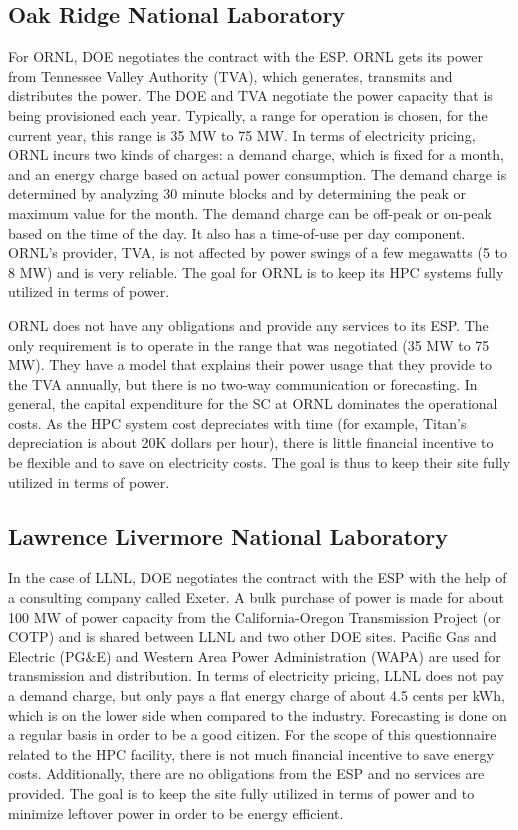\subsection{Oak Ridge National Laboratory}
For ORNL, DOE negotiates the contract with the ESP.  ORNL gets its power from Tennessee Valley Authority (TVA), which generates, transmits and distributes the power. The DOE and TVA negotiate the power capacity that is being provisioned each year. Typically, a range for operation is chosen, for the current year, this range is 35 MW to 75 MW. 
In terms of electricity pricing, ORNL incurs two kinds of charges: a demand charge, which is fixed for a month, and an energy charge based on actual power consumption. The demand charge is determined by analyzing 30 minute blocks and by determining the peak or maximum value for the month. The demand charge can be off-peak or on-peak based on the time of the day. It also has a time-of-use per day component. ORNL's provider, TVA, is not affected by power swings of a few megawatts (5 to 8 MW) and is very reliable. The goal for ORNL is to keep its HPC systems fully utilized in terms of power. 

ORNL does not have any obligations and provide any services to its ESP.  The only requirement is to operate in the range that was negotiated (35 MW to 75 MW). They have a model that explains their power usage that they provide to the TVA annually, but there is no two-way communication or forecasting. In general, the capital expenditure for the SC at ORNL dominates the operational costs. As the HPC system cost depreciates with time (for example, Titan's depreciation is about 20K dollars per hour), there is little financial incentive to be flexible and to save on electricity costs. The goal is thus to keep their site fully utilized in terms of power. 

\subsection{Lawrence Livermore National Laboratory}
In the case of LLNL,  DOE negotiates the contract with the ESP with the help of a consulting company called Exeter.  A bulk purchase of power is made for about 100 MW of power capacity from the California-Oregon Transmission Project (or COTP) and is shared between LLNL and two other DOE sites. Pacific Gas and Electric (PG\&E) and Western Area Power Administration (WAPA) are used for transmission and distribution. In terms of electricity pricing, LLNL does not pay a demand charge, but only pays a flat energy charge of about 4.5 cents per kWh, which is on the lower side when compared to the industry. Forecasting is done on a regular basis in order to be a good citizen. For the scope of this questionnaire related to the HPC facility, there is not much financial incentive to save energy costs. Additionally, there are no obligations from the ESP and no services are provided. The goal is to keep the site fully utilized in terms of power and to minimize leftover power in order to be energy efficient.  

